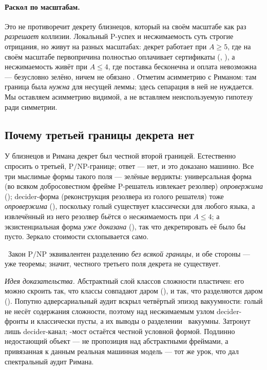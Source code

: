 \paragraph{Раскол по масштабам.}
Это не противоречит декрету близнецов, который на своём масштабе как раз \emph{разрешает} коллизии.
Локальный P-успех и несжимаемость суть строгие отрицания, но живут на разных масштабах: декрет
работает при $A \ge 5$, где на своём масштабе первопричина полностью оплачивает сертификаты
(, \yellow{}), а несжимаемость живёт при $A \le 4$, где поставка
бесконечна и оплата невозможна --- безусловно зелёно, ничем не обязано \axiom{}. Отметим асимметрию
с Риманом: там граница была \emph{нужна} для несущей леммы; здесь сепарация в ней не нуждается. Мы
оставляем асимметрию видимой, а не вставляем неиспользуемую гипотезу ради симметрии.

\subsection{Почему третьей границы декрета нет}

У близнецов и Римана декрет был честной второй границей. Естественно спросить о третьей,
$\mathrm{P}/\mathrm{NP}$-границе; ответ --- нет, и это доказано машинно. Все три мыслимые формы
такого поля --- зелёные вердикты: универсальная форма (во всяком добросовестном фрейме P-решатель
извлекает резолвер) \emph{опровержима} (); decider-форма
(реконструкция резолвера из голого решателя) тоже \emph{опровержима}
(), поскольку голый  существует классически для
любого языка, а извлечённый из него резолвер бьётся о несжимаемость при $A \le 4$; а
экзистенциальная форма \emph{уже доказана} (), так что декретировать
её было бы пусто. Зеркало стоимости схлопывается само.

\begin{proposition}\label{thm:pnpLaw_asserts_separation}
\green{}\ Закон $\mathrm{P}/\mathrm{NP}$ эквивалентен разделению \emph{без всякой границы}, и обе
стороны --- уже теоремы; значит, честного третьего поля декрета не существует.
\end{proposition}

\emph{Идея доказательства.} Абстрактный слой классов сложности пластичен: его можно скроить так,
что классы совпадают даром (), и так, что разделяются даром ().
Попутно адверсариальный аудит вскрыл четвёртый эпизод вакуумности: голый  не несёт
содержания сложности, поэтому над несжимаемым узлом decider-фронты
 и  классически пусты, а их выводы о
разделении \warn{}~вакуумны. Затронут лишь decider-канал; -мост
 остаётся честной условной формой. Подлинно недостающий объект --- не
пропозиция над абстрактными фреймами, а привязанная к данным реальная машинная модель --- тот же
урок, что дал спектральный аудит Римана.

